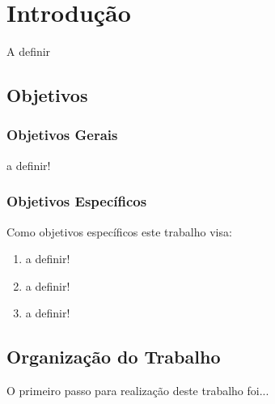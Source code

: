 \chapter{Introdução}

A definir

\section{Objetivos}

\subsection{Objetivos Gerais}

a definir!

\subsection{Objetivos Específicos}

Como objetivos específicos este trabalho visa:

\begin{enumerate}
\item a definir!
\item a definir!
\item a definir!
\end{enumerate}

\section{Organização do Trabalho}

O primeiro passo para realização deste trabalho foi...


